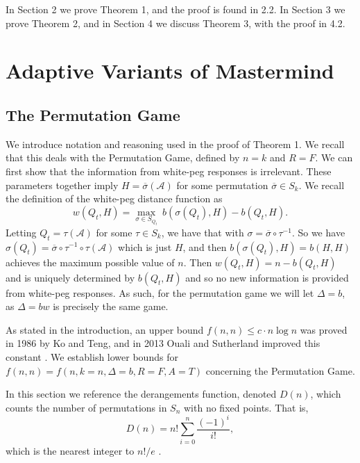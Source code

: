 \documentclass[12pt, a4paper]{article}
\newcommand{\inv}{^{-1}}              %
\begin{document}
In Section 2 we prove Theorem 1, and the proof is found in 2.2. In Section 3 we prove Theorem 2, and in Section 4 we discuss Theorem 3, with the proof in 4.2.
\section{Adaptive Variants of Mastermind}
\subsection{The Permutation Game}
We introduce notation and reasoning used in the proof of Theorem 1. We recall that this deals with the Permutation Game, defined by $n=k$ and $R=F$. We can first show that the information from white-peg responses is irrelevant. These parameters together imply $H=\overline{\sigma}(\mathcal{A})$ for some permutation $\overline{\sigma}\in S_k$. We recall the definition of the white-peg distance function as
\begin{equation*}
	w(Q_t, H) = \max_{\sigma\in S_{Q_t}}~b(\sigma(Q_t), H) - b(Q_t, H).
\end{equation*}
Letting $Q_t = \tau(\mathcal{A})$ for some $\tau \in S_k$, we have that with $\sigma = \overline{\sigma}\circ \tau\inv$. So we have $\sigma(Q_t) = \overline{\sigma}\circ\tau\inv\circ\tau(\mathcal A)$ which is just $H$, and then $b(\sigma(Q_t),H) = b(H,H)$ achieves the maximum possible value of $n$. Then $w(Q_t,H) = n - b(Q_t,H)$ and is uniquely determined by $b(Q_t,H)$ and so no new information is provided from white-peg responses. As such, for the permutation game we will let $\Delta = b$, as $\Delta = bw$ is precisely the same game.

 As stated in the introduction, an upper bound $f(n, n)\le c\cdot n\log n$ was proved in 1986 by Ko and Teng, and in 2013 Ouali and Sutherland improved this constant \cite{KT86, OS13}. We establish lower bounds for $f(n, n) = f(n, k=n, \Delta=b, R=F, A=T)$ concerning the Permutation Game.
 
 In this section we reference the derangements function, denoted $D(n)$, which counts the number of permutations in $S_n$ with no fixed points. That is,
\begin{equation}\label{derangements}
	D(n) = n!\sum_{i=0}^n \frac{(-1)^i}{i!},
\end{equation}
which is the nearest integer to $n!/e$  \cite{MH03}.
\end{document}
